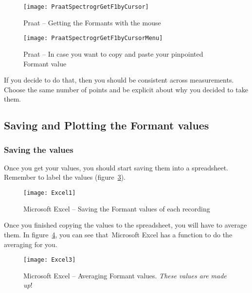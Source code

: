 \documentclass{article}
\newcommand{\soft}[1]{\textsf{#1}}
\newcommand{\MSExcel}{\soft{Microsoft\texttrademark{} Excel}}
\newcommand{\Praat}{\soft{Praat}}
\begin{document}
\begin{figure}[!tbp]
\caption{\Praat{} -- Getting the Formants with the mouse}
\label{step4measure}
	\begin{center}
		\texttt{[image: PraatSpectrogrGetF1byCursor]}
	\end{center}
\end{figure}

\begin{figure}[!tbp]
\caption{\Praat{} -- In case you want to copy and paste your pinpointed Formant value}
\label{step5measure}
	\begin{center}
		\texttt{[image: PraatSpectrogrGetF1byCursorMenu]}
	\end{center}
\end{figure}

If you decide to do that, then you should be consistent across measurements. Choose the same number of points and be explicit about why you decided to take them.  

\subsection{Saving and Plotting the Formant values}

\subsubsection{Saving the values}
Once you get your values, you should start saving them into a spreadsheet. Remember to label the values (figure~\ref{step1save}).

\begin{figure}[!tbp]
\caption{\MSExcel{} -- Saving the Formant values of each recording}
\label{step1save}
	\begin{center}
		\texttt{[image: Excel1]}
	\end{center}
\end{figure}

Once you finished copying the values to the spreadsheet, you will have to average them. In figure~\ref{step2save}, you can see that~\MSExcel{} has a function to do the averaging for you.

\begin{figure}[!tbp]
\caption{\MSExcel{} -- Averaging Formant values. \emph{These values are made up}!}
\label{step2save}
	\begin{center}
		\texttt{[image: Excel3]}
	\end{center}
\end{figure}
\end{document}
